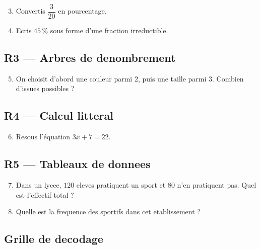 \begin{enumerate}
  \setcounter{enumi}{2}

  \item Convertis $\dfrac{3}{20}$ en pourcentage.

  \item Ecris $45\,\%$ sous forme d'une fraction irreductible.

\end{enumerate}

\subsection*{R3 --- Arbres de denombrement}

\begin{enumerate}
  \setcounter{enumi}{4}

  \item On choisit d'abord une couleur parmi 2, puis une taille parmi 3. Combien d'issues possibles ?

\end{enumerate}

\subsection*{R4 --- Calcul litteral}

\begin{enumerate}
  \setcounter{enumi}{5}

  \item Resous l'équation $3x + 7 = 22$.

\end{enumerate}

\subsection*{R5 --- Tableaux de donnees}

\begin{enumerate}
  \setcounter{enumi}{6}

  \item Dans un lycee, $120$ eleves pratiquent un sport et $80$ n'en pratiquent pas. Quel est l'effectif total ?

  \item Quelle est la frequence des sportifs dans cet etablissement ?

\end{enumerate}

\bigskip

\subsection*{Grille de decodage}

